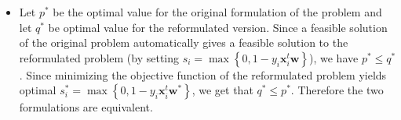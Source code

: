 \documentclass{article}
\begin{document}
   \begin{itemize}
       \item Let $p^{*}$ be the optimal
           value for the original formulation of the problem
           and let $q^{*}$ be optimal value
           for the reformulated version.
           Since a feasible solution of the
           original problem automatically gives
           a feasible solution to the
           reformulated problem (by setting
           $s_{i} = \max\left\{0, 1 - y_{i}\mathbf{x}_{i}^{t}\mathbf{w}\right\}$),
           we have $p^{*} \leq q^{*}$.
           Since minimizing the objective function 
           of the reformulated problem yields
           optimal $s_{i}^{*} = \max\left\{0, 1 - y_{i} \mathbf{x}_{i}^{t} \mathbf{w}^{*}\right\}$,
           we get that $q^{*} \leq p^{*}$.
           Therefore the two formulations are equivalent.


\end{itemize}
\end{document}
